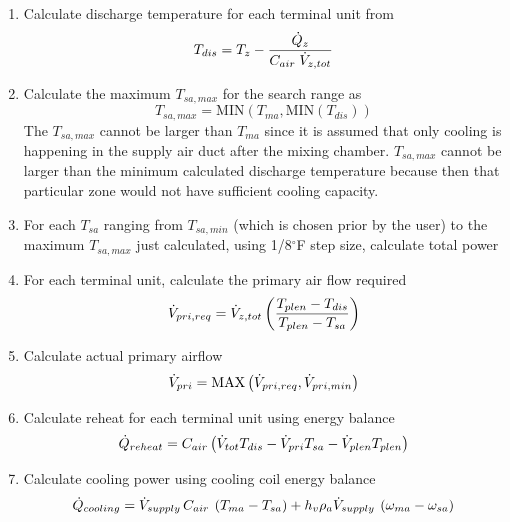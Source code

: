 \begin{enumerate}
    \item Calculate discharge temperature for each terminal unit from 
        \begin{equation}
            T_{dis}=T_{z} - \frac{\dot{Q}_{z}}{C_{air} \; \dot{V}_{z,tot}  }   
        \end{equation}
    \item Calculate the maximum \(T_{sa,max}\) for the search range as 
        \begin{equation}
            T_{sa,max}  = \text{MIN}\left(T_{ma}, \text{MIN}(T_{dis}) \right)
        \end{equation}
        The \(T_{sa,max}\) cannot be larger than \(T_{ma}\) since it is
        assumed that only cooling is happening in the supply air duct
        after the mixing chamber. \(T_{sa,max}\) cannot be larger than
        the minimum calculated discharge temperature because then that
        particular zone would not have sufficient cooling capacity. 
    \item For each \(T_{sa}\) ranging from \(T_{sa,min}\) (which is
        chosen prior by the user) to the maximum \(T_{sa,max}\) just
        calculated, using 1/8\(^{\circ}\)F step size, calculate total
        power
    \item For each terminal unit, calculate the primary air flow required
    \begin{equation} \dot{V}_{pri, req} = \dot{V}_{z,tot} \left( \frac{T_{plen} - T_{dis} }{T_{plen} - T_{sa}} \right) \end{equation}
    \item Calculate actual primary airflow
        \begin{equation}\label{eq:PrimaryFlowRequired}
            \dot{V}_{pri} = \text{MAX}\left(\dot{V}_{pri,req}, \dot{V}_{pri,min}  \right)
        \end{equation}
    \item Calculate reheat for each terminal unit using energy balance
        \begin{equation}\label{eq:reheatPerZone}
            \dot{Q}_{reheat} = C_{air} \left(\dot{V}_{tot} T_{dis} - \dot{V}_{pri} T_{sa} - \dot{V}_{plen} T_{plen}\right)  
        \end{equation}
    \item Calculate cooling power using cooling coil energy balance
        \begin{equation}\label{eq:TotalCoolingPower}
            {\dot Q_{cooling}} = {\flow{supply}}\,\heatCapacity\:\left( {{T_{ma}} - {\sat}} \right) + h_v\rho_a{\flow{supply}}\:\left( {{\omega _{ma}} - {\omega _{sa}}} \right)

\end{equation}
\end{enumerate}
